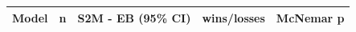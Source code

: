 \begin{tabular}{lcccc}
\toprule
Model & n & S2M - EB (95\% CI) & wins/losses & McNemar p \\
\midrule
\bottomrule
\end{tabular}
